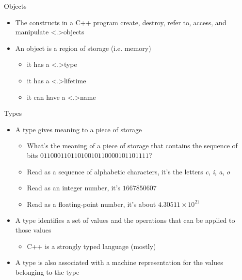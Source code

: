 \begin{frame}{Objects}

  \begin{itemize}[<+->]
  \item The constructs in a C++ program create, destroy, refer to, access,
    and manipulate \alert<.>{objects}
  \item An object is a region of storage (i.e. memory)
    \begin{itemize}[<+->]
    \item it has a \alert<.>{type}
    \item it has a \alert<.>{lifetime}
    \item it can have a \alert<.>{name}
    \end{itemize}
  \end{itemize}

\end{frame}

\begin{frame}{Types}

  \begin{itemize}[<+->]
  \item A type gives meaning to a piece of storage
    \begin{itemize}
    \item What's the meaning of a piece of storage that contains the sequence of
      bits $01100011011010010110000101101111$?
    \item Read as a sequence of alphabetic characters, it's the letters
      \textit{c}, \textit{i}, \textit{a}, \textit{o}
    \item Read as an integer number, it's $1667850607$
    \item Read as a floating-point number, it's about $4.30511 \times 10^{21}$
    \end{itemize}
  \item A type identifies a set of values and the operations that can be applied
    to those values
    \begin{itemize}
    \item C++ is a \alert{strongly typed} language (mostly)
    \end{itemize}
  \item A type is also associated with a machine representation for the values
    belonging to the type
  \end{itemize}

\end{frame}

